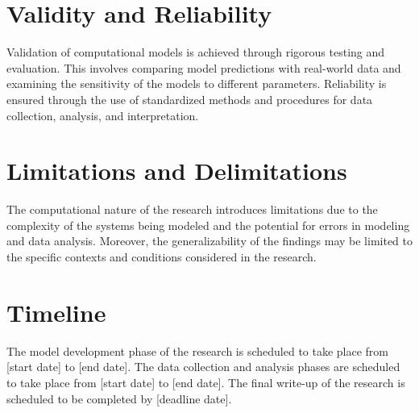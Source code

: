 \section{Validity and Reliability}

Validation of computational models is achieved through rigorous testing and evaluation. This involves comparing model predictions with real-world data and examining the sensitivity of the models to different parameters. Reliability is ensured through the use of standardized methods and procedures for data collection, analysis, and interpretation.

\section{Limitations and Delimitations}

The computational nature of the research introduces limitations due to the complexity of the systems being modeled and the potential for errors in modeling and data analysis. Moreover, the generalizability of the findings may be limited to the specific contexts and conditions considered in the research.

\section{Timeline}

The model development phase of the research is scheduled to take place from [start date] to [end date]. The data collection and analysis phases are scheduled to take place from [start date] to [end date]. The final write-up of the research is scheduled to be completed by [deadline date].